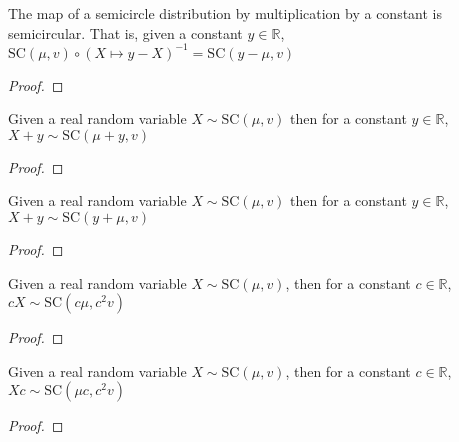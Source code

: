 \begin{lemma}\label{lem:semicircleReal_map_const_sub}
  \mathlibok
  The map of a semicircle distribution by multiplication by a constant is semicircular. That is,
  given a constant $y \in \mathbb{R}$, $ \mathrm{SC}(\mu, v) \circ (X \mapsto y-X  )^{-1} = \mathrm{SC}(y-\mu  , v)$
  \begin{proof}

  \end{proof}
\end{lemma}


\begin{lemma}\label{lem:semicircleReal_add_const}
  \mathlibok
  Given a real random variable $X \sim \mathrm{SC}(\mu, v)$
  then for a constant $y \in \mathbb{R}$, $X + y \sim \mathrm{SC}(\mu + y, v)$
  \begin{proof}
  \end{proof}
\end{lemma}


\begin{lemma}\label{lem:semicircleReal_const_add}
  \mathlibok
  Given a real random variable $X \sim \mathrm{SC}(\mu, v)$
  then for a constant $y \in \mathbb{R}$, $X + y \sim \mathrm{SC}(y + \mu, v)$
  \begin{proof}

  \end{proof}
\end{lemma}


\begin{lemma}\label{lem:semicircleReal_const_mul}
  \mathlibok
  Given a real random variable $X \sim \mathrm{SC}(\mu, v)$,
  then for a constant $c \in \mathbb{R}$, $cX \sim \mathrm{SC}(c\mu , c^2v)$
  \begin{proof}

  \end{proof}
\end{lemma}


\begin{lemma}\label{lem:semicircleReal_mul_const}
  \mathlibok
   Given a real random variable $X \sim \mathrm{SC}(\mu, v)$,
  then for a constant $c \in \mathbb{R}$, $Xc \sim \mathrm{SC}(\mu c , c^2v)$
  \begin{proof}

  \end{proof}
\end{lemma}

